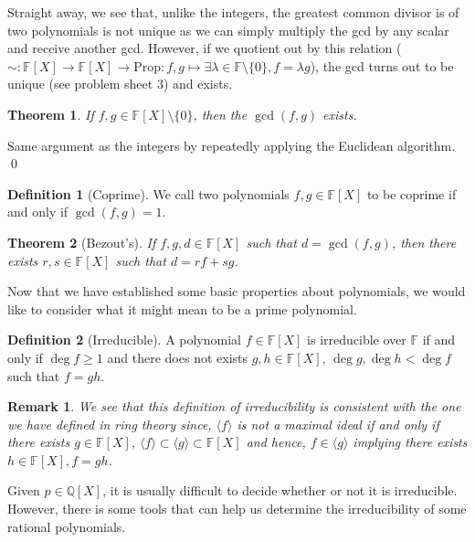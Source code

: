 \documentclass[
]{article}
\newtheorem{theorem}{Theorem}
\newtheorem*{remark}{Remark}
\theoremstyle{definition}
\newtheorem{definition}{Definition}[section]
\begin{document}
Straight away, we see that, unlike the integers, the greatest common
divisor is of two polynomials is not unique as we can simply multiply
the gcd by any scalar and receive another gcd. However, if we quotient
out by this relation
(\(\sim : \mathbb{F}[X] \to \mathbb{F}[X] \to \text{Prop} : f, g \mapsto \exists \lambda \in \mathbb{F} \setminus \{0\}, f = \lambda g\)),
the gcd turns out to be unique (see problem sheet 3) and exists.

\begin{theorem}
  If \(f, g \in \mathbb{F}[X] \setminus \{0\}\), then the \(\gcd(f, g)\) exists.
\end{theorem}
\proof

Same argument as the integers by repeatedly applying the Euclidean
algorithm. \qed

\begin{definition}[Coprime]
  We call two polynomials \(f, g \in \mathbb{F}[X]\) to be coprime if and only if
  \(\gcd(f, g) = 1\).
\end{definition}

\begin{theorem}[Bezout's]
  If \(f, g, d \in \mathbb{F}[X]\) such that \(d = \gcd(f, g)\), then there 
  exists \(r, s \in \mathbb{F}[X]\) such that \(d = r f + s g\).
\end{theorem}

Now that we have established some basic properties about polynomials, we
would like to consider what it might mean to be a prime polynomial.

\begin{definition}[Irreducible]
  A polynomial \(f \in \mathbb{F}[X]\) is irreducible over \(\mathbb{F}\) if 
  and only if \(\deg f \ge 1\) and there does not exists 
  \(g, h \in \mathbb{F}[X]\), \(\deg g, \deg h < \deg f\) such that \(f = gh\). 
\end{definition}
\begin{remark}
  We see that this definition of irreducibility is consistent with the one we 
  have defined in ring theory since, \(\langle f \rangle\) is not a maximal 
  ideal if and only if there exists \(g \in \mathbb{F}[X]\), 
  \(\langle f \rangle \subset \langle g \rangle \subset \mathbb{F}[X]\) and 
  hence, \(f \in \langle g \rangle\) implying there exists 
  \(h \in \mathbb{F}[X], f = gh\).
\end{remark}

Given \(p \in \mathbb{Q}[X]\), it is usually difficult to decide whether
or not it is irreducible. However, there is some tools that can help us
determine the irreducibility of some rational polynomials.
\end{document}
